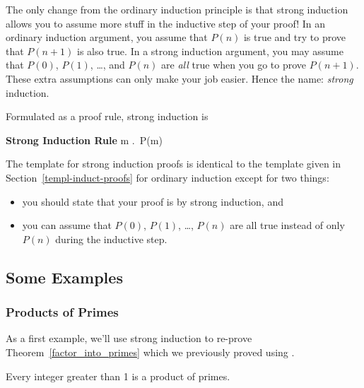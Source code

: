The only change from the ordinary induction principle is that strong
induction allows you to assume more stuff in the inductive step of your
proof!  In an ordinary induction argument, you assume that $P(n)$ is true
and try to prove that $P(n+1)$ is also true.  In a strong induction
argument, you may assume that $P(0)$, $P(1)$, \dots, and $P(n)$ are
\emph{all} true when you go to prove $P(n+1)$.  These extra assumptions
can only make your job easier.  Hence the name: \emph{strong}
induction.

Formulated as a proof rule, strong induction is
\begin{rul*} \textbf{Strong Induction Rule}
\Rule{P(0), \quad \forall n \in \naturals. \;
    \bigl(P(0) \QAND P(1) \QAND \dots \QAND P(m) \bigr) \QIMPLIES P(n+1)]}
{\forall m \in \naturals.\, P(m)}
\end{rul*}

The template for strong induction proofs is identical to the template
given in Section~\ref{templ-induct-proofs} for ordinary induction
except for two things:
\begin{itemize}

\item
you should state that your proof is by strong induction, and

\item
you can assume that $P(0)$, $P(1)$, \dots, $P(n)$ are all true instead
of only $P(n)$ during the inductive step.

\end{itemize}

\subsection{Some Examples}

\subsubsection{Products of Primes}

As a first example, we'll use strong induction to re-prove
Theorem~\ref{factor_into_primes} which we previously proved using .

\begin{lemma}\label{prim}
Every integer greater than 1 is a product of primes.
\end{lemma}

